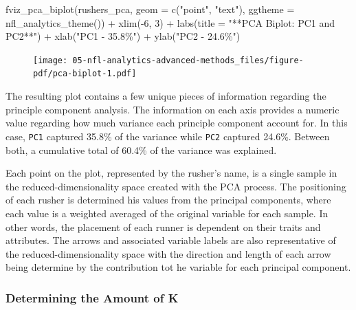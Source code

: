 \documentclass[
  letterpaper,
]{krantz}
\newenvironment{Shaded}{\begin{snugshade}}{\end{snugshade}}
\newcommand{\AttributeTok}[1]{\textcolor[rgb]{0.40,0.45,0.13}{#1}}
\newcommand{\DecValTok}[1]{\textcolor[rgb]{0.68,0.00,0.00}{#1}}
\newcommand{\FunctionTok}[1]{\textcolor[rgb]{0.28,0.35,0.67}{#1}}
\newcommand{\NormalTok}[1]{\textcolor[rgb]{0.00,0.23,0.31}{#1}}
\newcommand{\SpecialCharTok}[1]{\textcolor[rgb]{0.37,0.37,0.37}{#1}}
\newcommand{\StringTok}[1]{\textcolor[rgb]{0.13,0.47,0.30}{#1}}
\begin{document}
\begin{Shaded}
\begin{Highlighting}[]
\FunctionTok{fviz\_pca\_biplot}\NormalTok{(rushers\_pca, }\AttributeTok{geom =} \FunctionTok{c}\NormalTok{(}\StringTok{"point"}\NormalTok{, }\StringTok{"text"}\NormalTok{),}
                \AttributeTok{ggtheme =} \FunctionTok{nfl\_analytics\_theme}\NormalTok{()) }\SpecialCharTok{+}
  \FunctionTok{xlim}\NormalTok{(}\SpecialCharTok{{-}}\DecValTok{6}\NormalTok{, }\DecValTok{3}\NormalTok{) }\SpecialCharTok{+}
  \FunctionTok{labs}\NormalTok{(}\AttributeTok{title =} \StringTok{"**PCA Biplot: PC1 and PC2**"}\NormalTok{) }\SpecialCharTok{+}
  \FunctionTok{xlab}\NormalTok{(}\StringTok{"PC1 {-} 35.8\%"}\NormalTok{) }\SpecialCharTok{+}
  \FunctionTok{ylab}\NormalTok{(}\StringTok{"PC2 {-} 24.6\%"}\NormalTok{)}
\end{Highlighting}
\end{Shaded}

\begin{figure}[H]

{\centering \texttt{[image: 05-nfl-analytics-advanced-methods\_files/figure-pdf/pca-biplot-1.pdf]}

}

\end{figure}

The resulting plot contains a few unique pieces of information regarding
the principle component analysis. The information on each axis provides
a numeric value regarding how much variance each principle component
account for. In this case, \texttt{PC1} captured 35.8\% of the variance
while \texttt{PC2} captured 24.6\%. Between both, a cumulative total of
60.4\% of the variance was explained.

Each point on the plot, represented by the rusher's name, is a single
sample in the reduced-dimensionality space created with the PCA process.
The positioning of each rusher is determined his values from the
principal components, where each value is a weighted averaged of the
original variable for each sample. In other words, the placement of each
runner is dependent on their traits and attributes. The arrows and
associated variable labels are also representative of the
reduced-dimensionality space with the direction and length of each arrow
being determine by the contribution tot he variable for each principal
component.

\hypertarget{determining-the-amount-of-k}{%
\subsubsection{Determining the Amount of
K}\label{determining-the-amount-of-k}}
\end{document}

